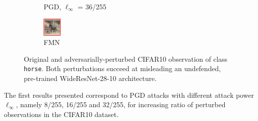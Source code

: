 \begin{figure}[H]
\begin{subfigure}[b]{0.25\textwidth}
        \caption{PGD, $\ell_\infty$ = 36/255}
    \end{subfigure}
    \hfill
    \begin{subfigure}[b]{0.25\textwidth}
        \centering
        \includegraphics[width=\textwidth]{img/results_discussion/adversarial/adv_fmn_framed.png}
        \caption{FMN}
    \end{subfigure}
    \caption{Original and adversarially-perturbed CIFAR10 observation of class \texttt{horse}. Both perturbations succeed
    at misleading an undefended, pre-trained WideResNet-28-10 architecture.}
\end{figure}

The first results presented correspond to PGD attacks with different attack power 
$\ell_\infty$, namely 8/255, 16/255 and 32/255, for increasing ratio of 
perturbed observations in the CIFAR10 dataset.

